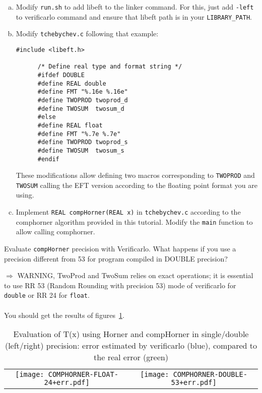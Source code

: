 \begin{question}
  \begin{enumerate}[(a)]
    \item Modify {\tt run.sh} to add libeft to the linker command. For this, just add {\tt -left} to verificarlo command and ensure that libeft path is in your  {\tt LIBRARY\_PATH}.
    \item Modify {\tt tchebychev.c} following that example:

      {
      \begin{lstlisting}[style=customC, basicstyle=\normalsize]
      #include <libeft.h>

      /* Define real type and format string */
      #ifdef DOUBLE
      #define REAL double
      #define FMT "%.16e %.16e"
      #define TWOPROD twoprod_d
      #define TWOSUM  twosum_d
      #else
      #define REAL float
      #define FMT "%.7e %.7e"
      #define TWOPROD twoprod_s
      #define TWOSUM  twosum_s
      #endif
      \end{lstlisting}
      }

     These modifications allow defining two macros corresponding to  {\tt TWOPROD} and {\tt TWOSUM} calling the EFT version according to the floating point format you are using.


    \item Implement {\tt REAL compHorner(REAL x)} in {\tt tchebychev.c} according to the comphorner algorithm provided in this tutorial. Modify the {\tt main} function to allow calling comphorner.
    \end{enumerate}
\end{question}


\begin{question}
  Evaluate {\tt compHorner} precision with Verificarlo. What happens if you use a precision different from 53 for program compiled in DOUBLE precision?

  $\Rightarrow$ WARNING, {\sc TwoProd} and {\sc TwoSum} relies on exact operations; it is essential to use RR 53 (Random Rounding with precision 53) mode of verificarlo for  \texttt{double} or RR 24 for \texttt{float}.
  \\~\\
  You should get the results of figures~\ref{fig:comphornerVerificarlo24_53}.
\end{question}


\begin{table}
\begin{tabular}{cc}
\texttt{[image: COMPHORNER-FLOAT-24+err.pdf]}& 
\texttt{[image: COMPHORNER-DOUBLE-53+err.pdf]}\\
\end{tabular}
  \caption{Evaluation of T(x) using Horner and compHorner in single/double (left/right) precision: error estimated by verificarlo (blue), compared to the real error (green)}
  \label{fig:comphornerVerificarlo24_53}
\end{table}



